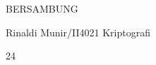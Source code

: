 \documentclass{article}
\begin{document}

BERSAMBUNG

Rinaldi Munir/II4021 Kriptografi

24
\end{document}
